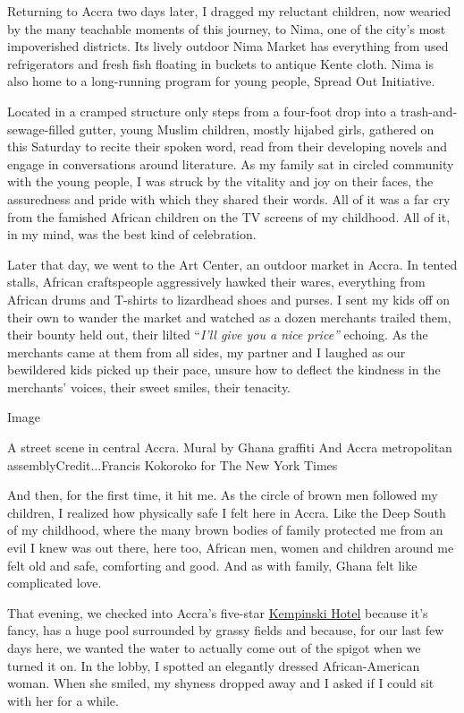 Returning to Accra two days later, I dragged my reluctant children, now
wearied by the many teachable moments of this journey, to Nima, one of
the city's most impoverished districts. Its lively outdoor Nima Market
has everything from used refrigerators and fresh fish floating in
buckets to antique Kente cloth. Nima is also home to a long-running
program for young people, Spread Out Initiative.

Located in a cramped structure only steps from a four-foot drop into a
trash-and-sewage-filled gutter, young Muslim children, mostly hijabed
girls, gathered on this Saturday to recite their spoken word, read from
their developing novels and engage in conversations around literature.
As my family sat in circled community with the young people, I was
struck by the vitality and joy on their faces, the assuredness and pride
with which they shared their words. All of it was a far cry from the
famished African children on the TV screens of my childhood. All of it,
in my mind, was the best kind of celebration.

Later that day, we went to the Art Center, an outdoor market in Accra.
In tented stalls, African craftspeople aggressively hawked their wares,
everything from African drums and T-shirts to lizardhead shoes and
purses. I sent my kids off on their own to wander the market and watched
as a dozen merchants trailed them, their bounty held out, their lilted
``\emph{I'll give you a nice price''} echoing. As the merchants came at
them from all sides, my partner and I laughed as our bewildered kids
picked up their pace, unsure how to deflect the kindness in the
merchants' voices, their sweet smiles, their tenacity.

Image

A street scene in central Accra. Mural by Ghana graffiti And Accra
metropolitan assemblyCredit...Francis Kokoroko for The New York Times

And then, for the first time, it hit me. As the circle of brown men
followed my children, I realized how physically safe I felt here in
Accra. Like the Deep South of my childhood, where the many brown bodies
of family protected me from an evil I knew was out there, here too,
African men, women and children around me felt old and safe, comforting
and good. And as with family, Ghana felt like complicated love.

That evening, we checked into Accra's five-star
\href{https://www.kempinski.com/en/accra/hotel-gold-coast-city/?utm_source=google\&utm_medium=cpc\&source=S46992213\&\&utm_campaign=KIACC1\%20-\%20Kempinksi+Gold+Coast+City+Accra+-+Brand\&utm_content=kempinski+hotel+ghana\&gclid=Cj0KCQjw6KrtBRDLARIsAKzvQIFwU_T4N4YMRqr--nPyS3qjB6IsipfvgDQo1QskMKvWl8cLF_aX4OIaAk3mEALw_wcB\&gclsrc=aw.ds}{Kempinski
Hotel} because it's fancy, has a huge pool surrounded by grassy fields
and because, for our last few days here, we wanted the water to actually
come out of the spigot when we turned it on. In the lobby, I spotted an
elegantly dressed African-American woman. When she smiled, my shyness
dropped away and I asked if I could sit with her for a while.

